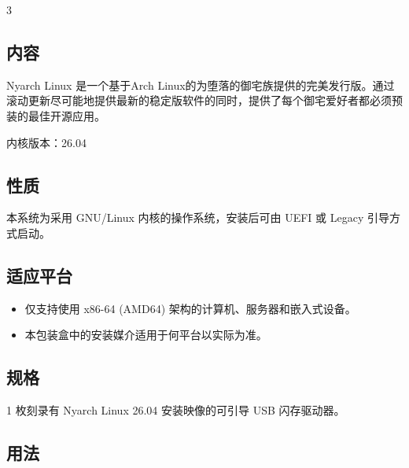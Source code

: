 \documentclass{article}
\begin{document}
\begin{multicols*}{3}
	\medskip


	\begin{tcolorbox}
	\section*{内容}
	\end{tcolorbox}

	Nyarch Linux 是一个基于Arch Linux的为堕落的御宅族提供的完美发行版。通过滚动更新尽可能地提供最新的稳定版软件的同时，提供了每个御宅爱好者都必须预装的最佳开源应用。

	内核版本：26.04

	\medskip


	\begin{tcolorbox}
	\section*{性质}
	\end{tcolorbox}

	本系统为采用 GNU/Linux 内核的操作系统，安装后可由 UEFI 或 Legacy 引导方式启动。

	\medskip


	\begin{tcolorbox}
	\section*{适应平台}
	\end{tcolorbox}

	\begin{itemize}
		\item 仅支持使用 x86-64 (AMD64) 架构的计算机、服务器和嵌入式设备。
		\item 本包装盒中的安装媒介适用于何平台以实际为准。
	\end{itemize}


	\begin{tcolorbox}
	\section*{规格}
	\end{tcolorbox}

	1 枚刻录有 Nyarch Linux 26.04 安装映像的可引导 USB 闪存驱动器。

	\medskip

	\begin{tcolorbox}
	\section*{用法}
	\end{tcolorbox}


\end{multicols*}
\end{document}
